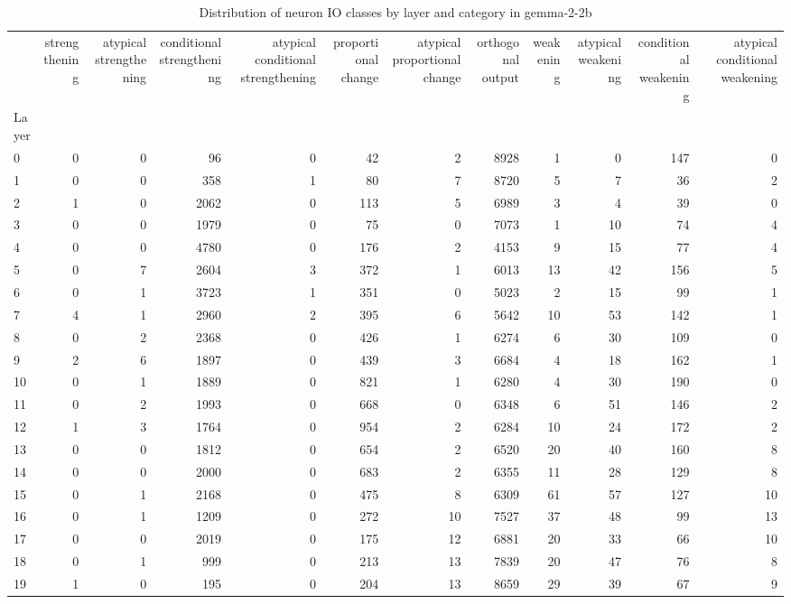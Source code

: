 \begin{table}
\caption{Distribution of neuron IO classes by layer and category in gemma-2-2b}
\label{tab:gemma-2-2b}
\begin{tabular}{lrrrrrrrrrrr}
 & strengthening & atypical strengthening & conditional strengthening & atypical conditional strengthening & proportional change & atypical proportional change & orthogonal output & weakening & atypical weakening & conditional weakening & atypical conditional weakening \\
Layer &  &  &  &  &  &  &  &  &  &  &  \\
0 & 0 & 0 & 96 & 0 & 42 & 2 & 8928 & 1 & 0 & 147 & 0 \\
1 & 0 & 0 & 358 & 1 & 80 & 7 & 8720 & 5 & 7 & 36 & 2 \\
2 & 1 & 0 & 2062 & 0 & 113 & 5 & 6989 & 3 & 4 & 39 & 0 \\
3 & 0 & 0 & 1979 & 0 & 75 & 0 & 7073 & 1 & 10 & 74 & 4 \\
4 & 0 & 0 & 4780 & 0 & 176 & 2 & 4153 & 9 & 15 & 77 & 4 \\
5 & 0 & 7 & 2604 & 3 & 372 & 1 & 6013 & 13 & 42 & 156 & 5 \\
6 & 0 & 1 & 3723 & 1 & 351 & 0 & 5023 & 2 & 15 & 99 & 1 \\
7 & 4 & 1 & 2960 & 2 & 395 & 6 & 5642 & 10 & 53 & 142 & 1 \\
8 & 0 & 2 & 2368 & 0 & 426 & 1 & 6274 & 6 & 30 & 109 & 0 \\
9 & 2 & 6 & 1897 & 0 & 439 & 3 & 6684 & 4 & 18 & 162 & 1 \\
10 & 0 & 1 & 1889 & 0 & 821 & 1 & 6280 & 4 & 30 & 190 & 0 \\
11 & 0 & 2 & 1993 & 0 & 668 & 0 & 6348 & 6 & 51 & 146 & 2 \\
12 & 1 & 3 & 1764 & 0 & 954 & 2 & 6284 & 10 & 24 & 172 & 2 \\
13 & 0 & 0 & 1812 & 0 & 654 & 2 & 6520 & 20 & 40 & 160 & 8 \\
14 & 0 & 0 & 2000 & 0 & 683 & 2 & 6355 & 11 & 28 & 129 & 8 \\
15 & 0 & 1 & 2168 & 0 & 475 & 8 & 6309 & 61 & 57 & 127 & 10 \\
16 & 0 & 1 & 1209 & 0 & 272 & 10 & 7527 & 37 & 48 & 99 & 13 \\
17 & 0 & 0 & 2019 & 0 & 175 & 12 & 6881 & 20 & 33 & 66 & 10 \\
18 & 0 & 1 & 999 & 0 & 213 & 13 & 7839 & 20 & 47 & 76 & 8 \\
19 & 1 & 0 & 195 & 0 & 204 & 13 & 8659 & 29 & 39 & 67 & 9 \\

\end{tabular}
\end{table}
